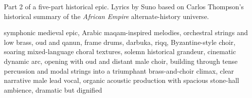 
\begin{notes}
Part 2 of a five-part historical epic. Lyrics by Suno based on Carlos Thompson's historical summary of the \emph{African Empire} alternate-history universe.
\end{notes}
\begin{style}
symphonic medieval epic, Arabic maqam-inspired melodies, orchestral strings and low brass, oud and qanun, frame drums, darbuka, riqq, Byzantine-style choir, soaring mixed-language choral textures, solemn historical grandeur, cinematic dynamic arc, opening with oud and distant male choir, building through tense percussion and modal strings into a triumphant brass-and-choir climax, clear narrative male lead vocal, organic acoustic production with spacious stone-hall ambience, dramatic but dignified
\end{style}
